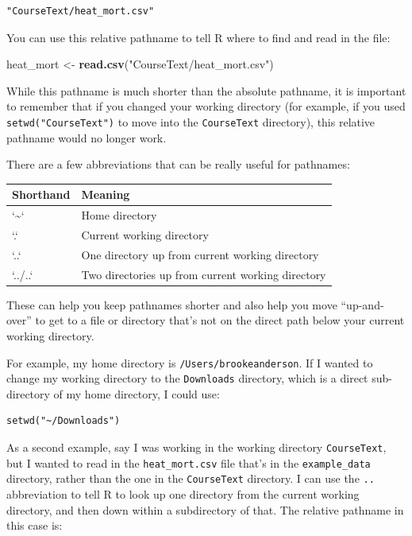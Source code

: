 \documentclass[]{book}
\makeatletter
\newenvironment{Shaded}{\begin{snugshade}}{\end{snugshade}}
\newcommand{\KeywordTok}[1]{\textcolor[rgb]{0.13,0.29,0.53}{\textbf{#1}}}
\newcommand{\StringTok}[1]{\textcolor[rgb]{0.31,0.60,0.02}{#1}}
\newcommand{\NormalTok}[1]{#1}
\newenvironment{kframe}{%
\medskip{}
\setlength{\fboxsep}{.8em}
 \def\at@end@of@kframe{}%
 \ifinner\ifhmode%
  \def\at@end@of@kframe{\end{minipage}}%
  \begin{minipage}{\columnwidth}%
 \fi\fi%
 \def\FrameCommand##1{\hskip\@totalleftmargin \hskip-\fboxsep
 \colorbox{shadecolor}{##1}\hskip-\fboxsep
     \hskip-\linewidth \hskip-\@totalleftmargin \hskip\columnwidth}%
 \MakeFramed {\advance\hsize-\width
   \@totalleftmargin\z@ \linewidth\hsize
   \@setminipage}}%
 {\par\unskip\endMakeFramed%
 \at@end@of@kframe}
\renewenvironment{Shaded}{\begin{kframe}}{\end{kframe}}
\theoremstyle{definition}
\theoremstyle{definition}
\theoremstyle{definition}
\theoremstyle{remark}
\makeatother
\begin{document}
\begin{verbatim}
"CourseText/heat_mort.csv"
\end{verbatim}

You can use this relative pathname to tell R where to find and read in
the file:

\begin{Shaded}
\begin{Highlighting}[]
\NormalTok{heat_mort <-}\StringTok{ }\KeywordTok{read.csv}\NormalTok{(}\StringTok{"CourseText/heat_mort.csv"}\NormalTok{)}
\end{Highlighting}
\end{Shaded}

While this pathname is much shorter than the absolute pathname, it is
important to remember that if you changed your working directory (for
example, if you used \texttt{setwd("CourseText")} to move into the
\texttt{CourseText} directory), this relative pathname would no longer
work.

There are a few abbreviations that can be really useful for pathnames:

\begin{tabular}{l|l}
\hline
Shorthand & Meaning\\
\hline
`\textasciitilde{}` & Home directory\\
\hline
`.` & Current working directory\\
\hline
`..` & One directory up from current working directory\\
\hline
`../..` & Two directories up from current working directory\\
\hline
\end{tabular}

These can help you keep pathnames shorter and also help you move
``up-and-over'' to get to a file or directory that's not on the direct
path below your current working directory.

For example, my home directory is \texttt{/Users/brookeanderson}. If I
wanted to change my working directory to the \texttt{Downloads}
directory, which is a direct sub-directory of my home directory, I could
use:

\begin{verbatim}
setwd("~/Downloads")
\end{verbatim}

As a second example, say I was working in the working directory
\texttt{CourseText}, but I wanted to read in the \texttt{heat\_mort.csv}
file that's in the \texttt{example\_data} directory, rather than the one
in the \texttt{CourseText} directory. I can use the \texttt{..}
abbreviation to tell R to look up one directory from the current working
directory, and then down within a subdirectory of that. The relative
pathname in this case is:
\end{document}
